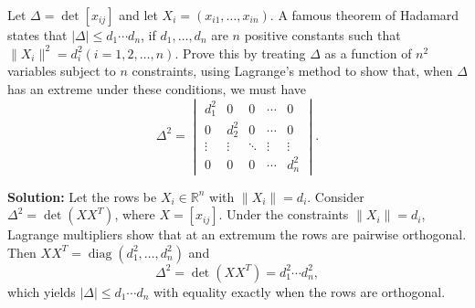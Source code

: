 \begin{problembox}
Let \(\Delta = \det [x_{ij}]\) and let \(X_i = (x_{i1}, \ldots, x_{in})\). A famous theorem of Hadamard states that \(|\Delta| \leq d_1 \cdots d_n\), if \(d_1, \ldots, d_n\) are \(n\) positive constants such that \(\| X_i \|^2 = d_i^2 (i = 1, 2, \ldots, n)\). Prove this by treating \(\Delta\) as a function of \(n^2\) variables subject to \(n\) constraints, using Lagrange's method to show that, when \(\Delta\) has an extreme under these conditions, we must have
\[\Delta^2 = 
\begin{vmatrix}
d_1^2 & 0 & 0 & \cdots & 0 \\
0 & d_2^2 & 0 & \cdots & 0 \\
\vdots & \vdots & \ddots & \vdots & \vdots \\
0 & 0 & 0 & \cdots & d_n^2
\end{vmatrix}.\]
\end{problembox}

\bigskip\noindent\textbf{Solution:}
Let the rows be $X_i\in\mathbb R^n$ with $\|X_i\|=d_i$. Consider $\Delta^2=\det(XX^{\!T})$, where $X=[x_{ij}]$. Under the constraints $\|X_i\|=d_i$, Lagrange multipliers show that at an extremum the rows are pairwise orthogonal. Then $XX^{\!T}=\operatorname{diag}(d_1^2,\dots,d_n^2)$ and
\[\Delta^2=\det(XX^{\!T})=d_1^2\cdots d_n^2,\]
which yields $|\Delta|\le d_1\cdots d_n$ with equality exactly when the rows are orthogonal.